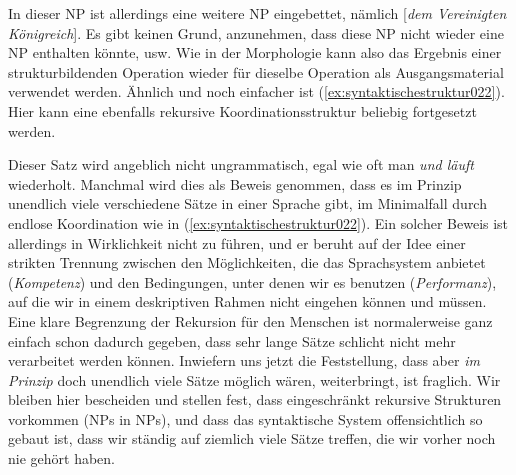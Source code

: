 In dieser NP ist allerdings eine weitere NP eingebettet, nämlich [\textit{dem Vereinigten Königreich}].
Es gibt keinen Grund, anzunehmen, dass diese NP nicht wieder eine NP enthalten könnte, usw.
Wie in der Morphologie kann also das Ergebnis einer strukturbildenden Operation wieder für dieselbe Operation als Ausgangsmaterial verwendet werden.
Ähnlich und noch einfacher ist (\ref{ex:syntaktischestruktur022}).
Hier kann eine ebenfalls rekursive Koordinationsstruktur beliebig fortgesetzt werden.\label{abs:syntaktischestruktur021}

\begin{exe}
\end{exe}

Dieser Satz wird angeblich nicht ungrammatisch, egal wie oft man \textit{und läuft} wiederholt.
Manchmal wird dies als Beweis genommen, dass es im Prinzip unendlich viele verschiedene Sätze in einer Sprache gibt, im Minimalfall durch endlose Koordination wie in (\ref{ex:syntaktischestruktur022}).
Ein solcher Beweis ist allerdings in Wirklichkeit nicht zu führen, und er beruht auf der Idee einer strikten Trennung zwischen den Möglichkeiten, die das Sprachsystem anbietet (\textit{Kompetenz}) und den Bedingungen, unter denen wir es benutzen (\textit{Performanz}), auf die wir in einem deskriptiven Rahmen nicht eingehen können und müssen.
Eine klare Begrenzung der Rekursion für den Menschen ist normalerweise ganz einfach schon dadurch gegeben, dass sehr lange Sätze schlicht nicht mehr verarbeitet werden können.
Inwiefern uns jetzt die Feststellung, dass aber \textit{im Prinzip} doch unendlich viele Sätze möglich wären, weiterbringt, ist fraglich.
Wir bleiben hier bescheiden und stellen fest, dass eingeschränkt rekursive Strukturen vorkommen (\zB NPs in NPs), und dass das syntaktische System offensichtlich so gebaut ist, dass wir ständig auf ziemlich viele Sätze treffen, die wir vorher noch nie gehört haben.


